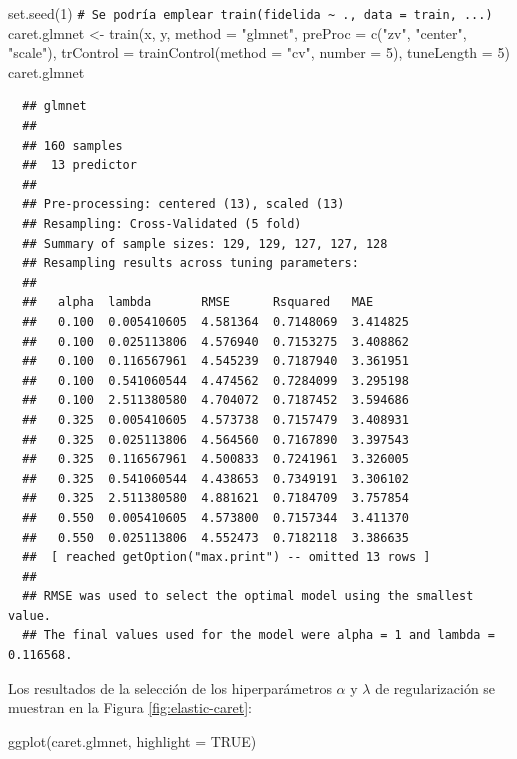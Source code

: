 \documentclass[
]{book}
\newenvironment{Shaded}{\begin{snugshade}}{\end{snugshade}}
\newcommand{\AttributeTok}[1]{\textcolor[rgb]{0.77,0.63,0.00}{#1}}
\newcommand{\CommentTok}[1]{\textcolor[rgb]{0.56,0.35,0.01}{\textit{#1}}}
\newcommand{\ConstantTok}[1]{\textcolor[rgb]{0.00,0.00,0.00}{#1}}
\newcommand{\DecValTok}[1]{\textcolor[rgb]{0.00,0.00,0.81}{#1}}
\newcommand{\FunctionTok}[1]{\textcolor[rgb]{0.00,0.00,0.00}{#1}}
\newcommand{\NormalTok}[1]{#1}
\newcommand{\OtherTok}[1]{\textcolor[rgb]{0.56,0.35,0.01}{#1}}
\newcommand{\StringTok}[1]{\textcolor[rgb]{0.31,0.60,0.02}{#1}}
\theoremstyle{break}
\theoremstyle{nonumberplain}
\renewcommand{\CommentTok}[1]{\textcolor[rgb]{0.41,0.41,0.41}{\texttt{#1}}}
\begin{document}
\begin{Shaded}
\begin{Highlighting}[]
\FunctionTok{set.seed}\NormalTok{(}\DecValTok{1}\NormalTok{)}
\CommentTok{\# Se podría emplear train(fidelida \textasciitilde{} ., data = train, ...)}
\NormalTok{caret.glmnet }\OtherTok{\textless{}{-}} \FunctionTok{train}\NormalTok{(x, y, }\AttributeTok{method =} \StringTok{"glmnet"}\NormalTok{,}
    \AttributeTok{preProc =} \FunctionTok{c}\NormalTok{(}\StringTok{"zv"}\NormalTok{, }\StringTok{"center"}\NormalTok{, }\StringTok{"scale"}\NormalTok{),}
    \AttributeTok{trControl =} \FunctionTok{trainControl}\NormalTok{(}\AttributeTok{method =} \StringTok{"cv"}\NormalTok{, }\AttributeTok{number =} \DecValTok{5}\NormalTok{),}
    \AttributeTok{tuneLength =} \DecValTok{5}\NormalTok{)}
\NormalTok{caret.glmnet}
\end{Highlighting}
\end{Shaded}

\begin{verbatim}
  ## glmnet 
  ## 
  ## 160 samples
  ##  13 predictor
  ## 
  ## Pre-processing: centered (13), scaled (13) 
  ## Resampling: Cross-Validated (5 fold) 
  ## Summary of sample sizes: 129, 129, 127, 127, 128 
  ## Resampling results across tuning parameters:
  ## 
  ##   alpha  lambda       RMSE      Rsquared   MAE     
  ##   0.100  0.005410605  4.581364  0.7148069  3.414825
  ##   0.100  0.025113806  4.576940  0.7153275  3.408862
  ##   0.100  0.116567961  4.545239  0.7187940  3.361951
  ##   0.100  0.541060544  4.474562  0.7284099  3.295198
  ##   0.100  2.511380580  4.704072  0.7187452  3.594686
  ##   0.325  0.005410605  4.573738  0.7157479  3.408931
  ##   0.325  0.025113806  4.564560  0.7167890  3.397543
  ##   0.325  0.116567961  4.500833  0.7241961  3.326005
  ##   0.325  0.541060544  4.438653  0.7349191  3.306102
  ##   0.325  2.511380580  4.881621  0.7184709  3.757854
  ##   0.550  0.005410605  4.573800  0.7157344  3.411370
  ##   0.550  0.025113806  4.552473  0.7182118  3.386635
  ##  [ reached getOption("max.print") -- omitted 13 rows ]
  ## 
  ## RMSE was used to select the optimal model using the smallest value.
  ## The final values used for the model were alpha = 1 and lambda = 0.116568.
\end{verbatim}



Los resultados de la selección de los hiperparámetros \(\alpha\) y \(\lambda\) de regularización se muestran en la Figura \ref{fig:elastic-caret}:

\begin{Shaded}
\begin{Highlighting}[]
\FunctionTok{ggplot}\NormalTok{(caret.glmnet, }\AttributeTok{highlight =} \ConstantTok{TRUE}\NormalTok{)}
\end{Highlighting}
\end{Shaded}
\end{document}
